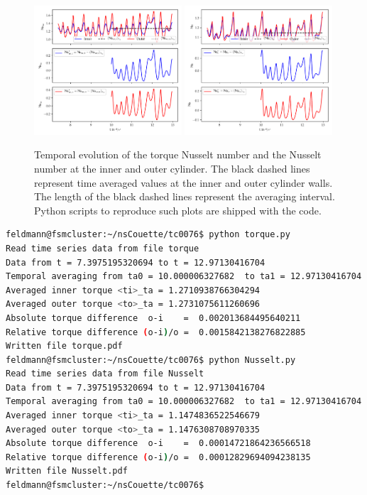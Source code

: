 \documentclass[a4paper, 11pt, DIV=11]{scrartcl}
\begin{document}
\begin{figure}[htb]
\centering
\includegraphics[width=0.49\textwidth]{figures/tc0076/torque.pdf}
\includegraphics[width=0.49\textwidth]{figures/tc0076/Nusselt.pdf}
\caption{Temporal evolution of the torque Nusselt number and the Nusselt
number at the inner and outer cylinder. The black dashed lines represent
time averaged values at the inner and outer cylinder walls. The length of
the black dashed lines represent the averaging interval. Python scripts
to reproduce such plots are shipped with the code.}
\label{fig:tc0076torqueNusseltCompare}
\end{figure}
\begin{lstlisting}[language=bash]
feldmann@fsmcluster:~/nsCouette/tc0076$ python torque.py  
Read time series data from file torque
Data from t = 7.3975195320694 to t = 12.97130416704
Temporal averaging from ta0 = 10.000006327682  to ta1 = 12.97130416704
Averaged inner torque <ti>_ta = 1.2710938766304294
Averaged outer torque <to>_ta = 1.2731075611260696
Absolute torque difference  o-i    =  0.002013684495640211
Relative torque difference (o-i)/o =  0.0015842138276822885
Written file torque.pdf   
feldmann@fsmcluster:~/nsCouette/tc0076$ python Nusselt.py  
Read time series data from file Nusselt
Data from t = 7.3975195320694 to t = 12.97130416704
Temporal averaging from ta0 = 10.000006327682  to ta1 = 12.97130416704
Averaged inner torque <ti>_ta = 1.1474836522546679
Averaged outer torque <to>_ta = 1.1476308708970335
Absolute torque difference  o-i    =  0.00014721864236566518
Relative torque difference (o-i)/o =  0.00012829694094238135
Written file Nusselt.pdf
feldmann@fsmcluster:~/nsCouette/tc0076$ 
\end{lstlisting}
\end{document}
